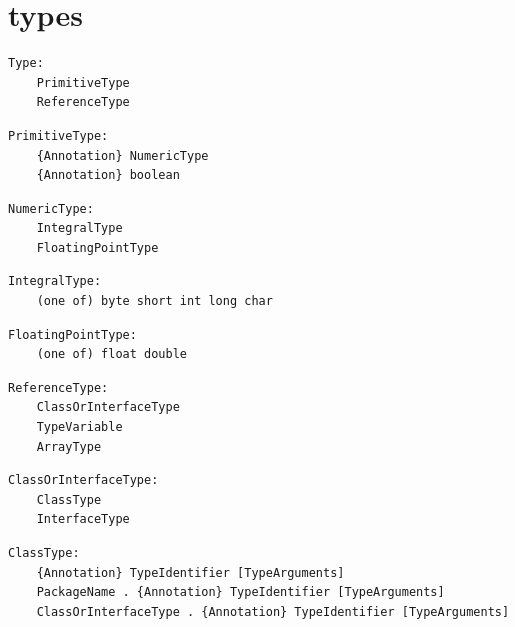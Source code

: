 \section{types}

\noindent\textbf{\texttt{}}\par
\begin{lstlisting}
Type:
    PrimitiveType
    ReferenceType
\end{lstlisting}

\noindent\textbf{\texttt{}}\par
\begin{lstlisting}
PrimitiveType:
    {Annotation} NumericType
    {Annotation} boolean
\end{lstlisting}

\noindent\textbf{\texttt{}}\par
\begin{lstlisting}
NumericType:
    IntegralType
    FloatingPointType
\end{lstlisting}

\noindent\textbf{\texttt{}}\par
\begin{lstlisting}
IntegralType:
    (one of) byte short int long char
\end{lstlisting}

\noindent\textbf{\texttt{}}\par
\begin{lstlisting}
FloatingPointType:
    (one of) float double
\end{lstlisting}

\noindent\textbf{\texttt{}}\par
\begin{lstlisting}
ReferenceType:
    ClassOrInterfaceType
    TypeVariable
    ArrayType
\end{lstlisting}

\noindent\textbf{\texttt{}}\par
\begin{lstlisting}
ClassOrInterfaceType:
    ClassType
    InterfaceType
\end{lstlisting}

\noindent\textbf{\texttt{}}\par
\begin{lstlisting}
ClassType:
    {Annotation} TypeIdentifier [TypeArguments]
    PackageName . {Annotation} TypeIdentifier [TypeArguments]
    ClassOrInterfaceType . {Annotation} TypeIdentifier [TypeArguments]
\end{lstlisting}

